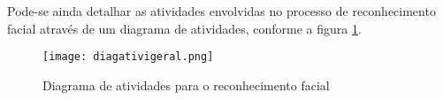 

Pode-se ainda detalhar as atividades envolvidas no processo de reconhecimento facial através de um diagrama de atividades, conforme a figura \ref{fig:figura05}. 

\begin{figure}[!ht]
	\centering
	\texttt{[image: diagativigeral.png]}   
	\caption{Diagrama de atividades para o reconhecimento facial}
	\label{fig:figura05}
\end{figure}


